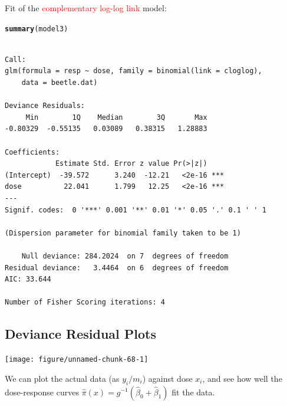 \documentclass[oneside]{book}\usepackage[]{graphicx}\usepackage[svgnames]{xcolor}
\makeatletter
\newcommand{\hlstd}[1]{\textcolor[rgb]{0.345,0.345,0.345}{#1}}%
\newcommand{\hlkwd}[1]{\textcolor[rgb]{0.737,0.353,0.396}{\textbf{#1}}}%
\newenvironment{kframe}{%
 \def\at@end@of@kframe{}%
 \ifinner\ifhmode%
  \def\at@end@of@kframe{\end{minipage}}%
  \begin{minipage}{\columnwidth}%
 \fi\fi%
 \def\FrameCommand##1{\hskip\@totalleftmargin \hskip-\fboxsep
 \colorbox{shadecolor}{##1}\hskip-\fboxsep
     \hskip-\linewidth \hskip-\@totalleftmargin \hskip\columnwidth}%
 \MakeFramed {\advance\hsize-\width
   \@totalleftmargin\z@ \linewidth\hsize
   \@setminipage}}%
 {\par\unskip\endMakeFramed%
 \at@end@of@kframe}
\newenvironment{knitrout}{}{} %
\makeatother
\begin{document}
Fit of the \textcolor{Red}{complementary log-log link} model:
\begin{knitrout}
\color{fgcolor}\begin{kframe}
\begin{alltt}
\hlkwd{summary}\hlstd{(model3)}
\end{alltt}
\begin{verbatim}

Call:
glm(formula = resp ~ dose, family = binomial(link = cloglog), 
    data = beetle.dat)

Deviance Residuals: 
     Min        1Q    Median        3Q       Max  
-0.80329  -0.55135   0.03089   0.38315   1.28883  

Coefficients:
            Estimate Std. Error z value Pr(>|z|)    
(Intercept)  -39.572      3.240  -12.21   <2e-16 ***
dose          22.041      1.799   12.25   <2e-16 ***
---
Signif. codes:  0 '***' 0.001 '**' 0.01 '*' 0.05 '.' 0.1 ' ' 1

(Dispersion parameter for binomial family taken to be 1)

    Null deviance: 284.2024  on 7  degrees of freedom
Residual deviance:   3.4464  on 6  degrees of freedom
AIC: 33.644

Number of Fisher Scoring iterations: 4
\end{verbatim}
\end{kframe}
\end{knitrout}
\subsection*{Deviance Residual Plots}
\begin{knitrout}
\color{fgcolor}

{\centering \texttt{[image: figure/unnamed-chunk-68-1]} 

}


\end{knitrout}
We can plot the actual data (as $ y_i/m_i $) against dose $ x_i $, and see how well the
dose-response curves $ \hat{\pi}(x)=g^{-1}(\hat{\beta}_0+\hat{\beta}_1) $ fit the data.
\end{document}
